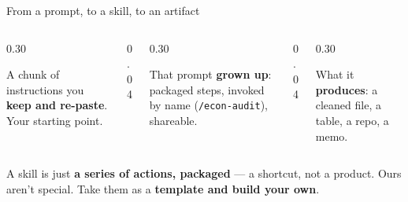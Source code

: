 \documentclass[aspectratio=169, 10pt]{beamer}
\begin{document}
\begin{frame}[fragile]{From a prompt, to a skill, to an artifact}
\vskip4pt
\begin{columns}[T,onlytextwidth]
\begin{column}{0.30\textwidth}
\begin{tcolorbox}[keybox, title={\faAlignLeft\quad Reusable prompt}, top=3pt, bottom=3pt]
\small A chunk of instructions you \textbf{keep and re-paste}. Your starting point.
\end{tcolorbox}
\end{column}
\begin{column}{0.04\textwidth}
\centering\vskip0.9cm{\large\color{UVMGold}\faArrowRight}
\end{column}
\begin{column}{0.30\textwidth}
\begin{tcolorbox}[keybox, title={\faMagic\quad Skill}, top=3pt, bottom=3pt]
\small That prompt \textbf{grown up}: packaged steps, invoked by name (\texttt{/econ-audit}), shareable.
\end{tcolorbox}
\end{column}
\begin{column}{0.04\textwidth}
\centering\vskip0.9cm{\large\color{UVMGold}\faArrowRight}
\end{column}
\begin{column}{0.30\textwidth}
\begin{tcolorbox}[keybox, title={\faFile\quad Artifact}, top=3pt, bottom=3pt]
\small What it \textbf{produces}: a cleaned file, a table, a repo, a memo.
\end{tcolorbox}
\end{column}
\end{columns}
\vskip8pt
\begin{tcolorbox}[coralbox, title={\faExclamationCircle\quad We have some skills you can use, and they are fine.}, top=3pt, bottom=3pt]
\small A skill is just \textbf{a series of actions, packaged} --- a shortcut, not a product. Ours aren't special. Take them as a \textbf{template and build your own}.
\end{tcolorbox}
\end{frame}
%
\end{document}
